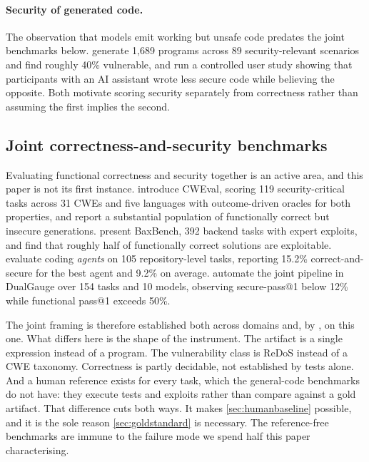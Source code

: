 \documentclass[11pt]{article}
\begin{document}
\paragraph{Security of generated code.}
The observation that models emit working but unsafe code predates the joint
benchmarks below. \citet{pearce2022asleep} generate 1{,}689 programs across
89 security-relevant scenarios and find roughly 40\% vulnerable, and
\citet{perry2023users} run a controlled user study showing that participants
with an AI assistant wrote less secure code while believing the opposite.
Both motivate scoring security separately from correctness rather than
assuming the first implies the second.

\subsection{Joint correctness-and-security benchmarks}
\label{sec:jointprior}

Evaluating functional correctness and security together is an active area, and
this paper is not its first instance. \citet{peng2025cweval} introduce CWEval,
scoring 119 security-critical tasks across 31 CWEs and five languages with
outcome-driven oracles for both properties, and report a substantial
population of functionally correct but insecure generations.
\citet{vero2025baxbench} present BaxBench, 392 backend tasks with expert
exploits, and find that roughly half of functionally correct solutions are
exploitable. \citet{chen2025secureagentbench} evaluate coding \emph{agents} on
105 repository-level tasks, reporting 15.2\% correct-and-secure for the best
agent and 9.2\% on average. \citet{patir2025dualgauge} automate the joint
pipeline in DualGauge over 154 tasks and 10 models, observing secure-pass@1
below 12\% while functional pass@1 exceeds 50\%.

The joint framing is therefore established both across domains and, by
\citet{siddiq2024regexeval}, on this one. What differs here is the shape of
the instrument. The artifact is a single expression instead of a program. The
vulnerability class is ReDoS instead of a CWE taxonomy. Correctness is partly
decidable, not established by tests alone. And a human reference exists for
every task, which the general-code benchmarks do not have: they execute tests
and exploits rather than compare against a gold artifact. That difference
cuts both ways. It makes \cref{sec:humanbaseline} possible, and it is the
sole reason \cref{sec:goldstandard} is necessary. The reference-free
benchmarks are immune to the failure mode we spend half this paper
characterising.
\end{document}
